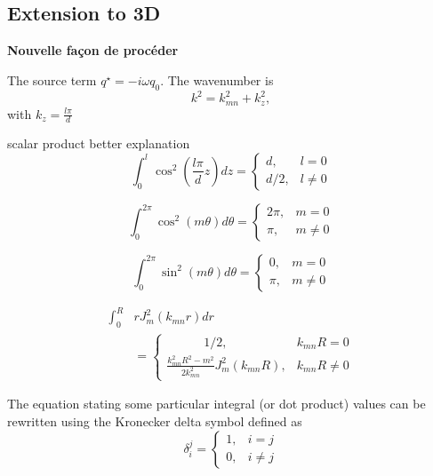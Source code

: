 \documentclass[%
 reprint,
 amsmath,amssymb,
 aip,
]{revtex4-1}
\begin{document}
\subsection{Extension to 3D}
\textbf{Nouvelle façon de procéder}

The source term $q^{\star} = -i \omega q_0$. The wavenumber is
\begin{equation}
    k^2 = k_{mn}^2 + k_z^2,
\end{equation}
with $k_z = \frac{l \pi}{d}$

scalar product better explanation
\begin{equation}
    \int_0^l \cos^2\left( \frac{l \pi}{d}z \right) dz = 
    \begin{cases}    
        d, & l = 0\\
        d/2, & l \ne 0
    \end{cases} \label{eq:dp_1}
\end{equation}

\begin{equation}
    \int_0^{2 \pi} \cos^2\left( m \theta \right) d\theta = 
    \begin{cases}    
        2 \pi, & m = 0\\
        \pi, & m \ne 0
    \end{cases} \label{eq:dp_2}
\end{equation}

\begin{equation}
    \int_0^{2 \pi} \sin^2\left( m \theta \right) d\theta = 
    \begin{cases}    
        0, & m = 0\\
        \pi, & m \ne 0
    \end{cases} \label{eq:dp_3}
\end{equation}

\begin{equation}
    \begin{split}
        \int_0^{R} &r J^2_m (k_{mn} r)dr \\ &=
    \begin{cases}    
        \quad  \quad \quad 1/2, & k_{mn}R = 0\\
        \frac{k^2_{mn} R^2 - m^2}{2 k^2_{mn}} J^2_m (k_{mn} R), & k_{mn}R \ne 0
    \end{cases}
    \end{split} \label{eq:dp_4}
\end{equation}

The equation stating some particular integral (or dot product) values can be rewritten using the Kronecker delta symbol defined as 
\begin{equation}
   \delta_i^j = \begin{cases}
       1, & i = j\\ 0, & i \ne j
   \end{cases} 
\end{equation}
\end{document}
